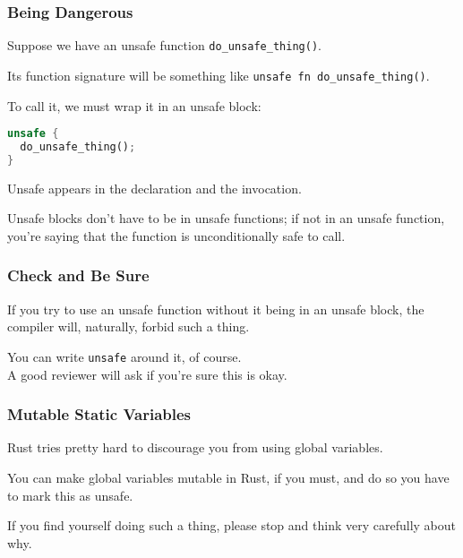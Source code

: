 \begin{frame}[fragile]
\frametitle{Being Dangerous}

Suppose we have an unsafe function \texttt{do\_unsafe\_thing()}.

Its function signature will be something like \texttt{unsafe fn do\_unsafe\_thing()}.

To call it, we must wrap it in an unsafe block:

\begin{lstlisting}[language=Rust]
unsafe {
  do_unsafe_thing();
}
\end{lstlisting}

Unsafe appears in the declaration and the invocation.

Unsafe blocks don't have to be in unsafe functions; if not in an unsafe function, you're saying
that the function is unconditionally safe to call.

\end{frame}


\begin{frame}
\frametitle{Check and Be Sure}

If you try to use an unsafe function without it being in an unsafe block, the compiler will, naturally, forbid such a thing.

You can write \texttt{unsafe} around it, of course.\\
\quad A good reviewer will ask if you're sure this is okay.


\end{frame}


\begin{frame}
\frametitle{Mutable Static Variables}

Rust tries pretty hard to discourage you from using global variables.

You can make global variables mutable in Rust, if you must, and do so you have to mark this as unsafe. 

If you find yourself doing such a thing, please stop and think very carefully about why.


\end{frame}




